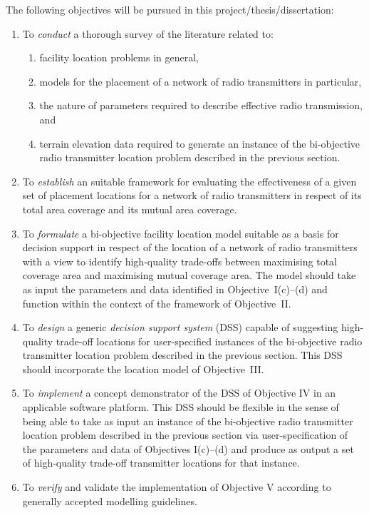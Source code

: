 The following objectives will be pursued in this project/thesis/dissertation:
\begin{enumerate}[label=\Roman*]										%
 \item To \textit{conduct} a thorough survey of the literature related to:
 \begin{enumerate}[label=(\alph*)]
  \item facility location problems in general,
  \item models for the placement of a network of radio transmitters in particular,
  \item the nature of parameters required to describe effective radio transmission, and
  \item terrain elevation data required to generate an instance of the bi-objective radio transmitter location problem described in the previous section.
 \end{enumerate}
 \item  To \textit{establish} an suitable framework for evaluating the effectiveness of a given set of placement locations for a network of radio transmitters in respect of its total area coverage and its mutual area coverage.
 \item To \textit{formulate} a bi-objective facility location model suitable as a basis for decision support in respect of the location of a network of radio transmitters with a view to identify high-quality trade-offs between maximising total coverage area and maximising mutual coverage area.  The model should take as input the parameters and data identified in Objective~I(c)--(d) and function within the context of the framework of Objective~II.
 \item To \textit{design} a generic \textit{decision support system} (DSS) capable of suggesting high-quality trade-off locations for user-specified instances of the bi-objective radio transmitter location problem described in the previous section.  This DSS should incorporate the location model of Objective~III.
 \item To \textit{implement} a concept demonstrator of the DSS of Objective IV in an applicable software platform.  This DSS should be flexible in the sense of being able to take as input an instance of the bi-objective radio transmitter location problem described in the previous section via user-specification of the parameters and data of Objectives I(c)--(d) and produce as output a set of high-quality trade-off transmitter locations for that instance.
 \item To \textit{verify} and validate the implementation of Objective V according to generally accepted modelling guidelines.

\end{enumerate}
